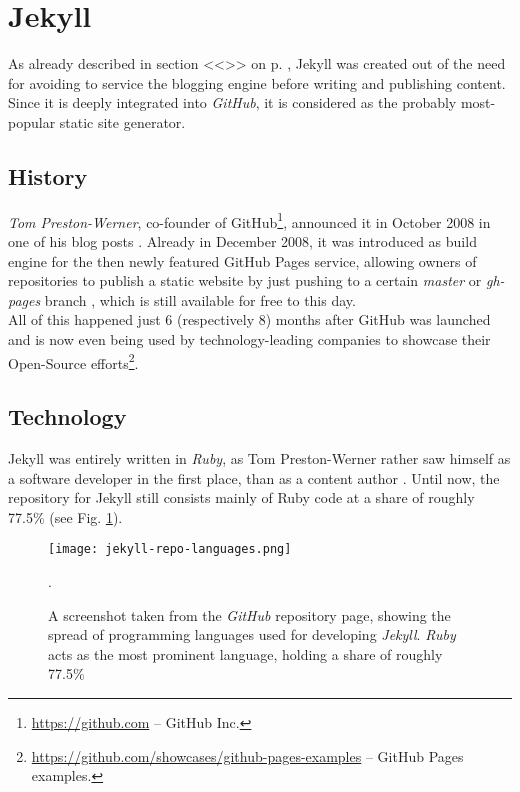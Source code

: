\section{Jekyll}
\label{sec:jekyll}

As already described in section <<\emph{}>> on p. \pageref{par:creatingcontent}, Jekyll was created out of the need for avoiding to service the blogging engine before writing and publishing content. Since it is deeply integrated into \emph{GitHub}, it is considered as the probably most-popular static site generator.

\subsection{History}
\label{sec:jekyll-history}
\emph{Tom Preston-Werner}, co-founder of GitHub\footnote{\url{https://github.com} -- GitHub Inc.}, announced it in October 2008 in one of his blog posts \cite{PrestonWerner2008jekyll}. Already in December 2008, it was introduced as build engine for the then newly featured GitHub Pages service, allowing owners of repositories to publish a static website by just pushing to a certain \emph{master} or \emph{gh-pages} branch \cite{PrestonWerner2008githubpages}, which is still available for free to this day.\\
All of this happened just 6 (respectively 8) months after GitHub was launched \cite{PrestonWerner2008githublaunch} and is now even being used by technology-leading companies to showcase their Open-Source efforts\footnote{\url{https://github.com/showcases/github-pages-examples} -- GitHub Pages examples.}.

\subsection{Technology}
\label{sec:jekyll-technology}
Jekyll was entirely written in \emph{Ruby}, as Tom Preston-Werner rather saw himself as a software developer in the first place, than as a content author \cite{PrestonWerner2008jekyll}. Until now, the repository for Jekyll still consists mainly of Ruby code at a share of roughly 77.5\% (see Fig. \ref{fig:jekyll-languages}).

\begin{figure}
    \centering
    \texttt{[image: jekyll-repo-languages.png]}
    \caption{A screenshot taken from the \emph{GitHub} repository page, showing the spread of programming languages used for developing \emph{Jekyll}. \emph{Ruby} acts as the most prominent language, holding a share of roughly 77.5\%}.
    \label{fig:jekyll-languages}
\end{figure}
%

